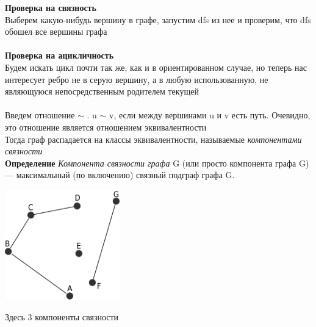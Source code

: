 \textbf{Проверка на связность} \\
Выберем какую-нибудь вершину в графе, запустим dfs из нее и проверим, что dfs обошел все вершины графа
\\
\\
\textbf{Проверка на ацикличность} \\
Будем искать цикл почти так же, как и в ориентированном случае, но теперь нас интересует ребро не в серую вершину, а в любую использованную, не являющуюся непосредственным родителем текущей
\\
\\
Введем отношение $\sim$ . u $\sim$ v, если между вершинами u и v есть путь. Очевидно, это отношение является отношением эквивалентности\\
Тогда граф распадается на классы эквивалентности, называемые \textit{компонентами связности} \\ 
\textbf{Определение} \textit{Компонента связности графа} G (или просто компонента графа G) — максимальный (по включению) связный подграф графа G.
\begin{center}
    \includegraphics[width=5cm]{images/34_alg18.png}
\end{center} Здесь 3 компоненты связности
